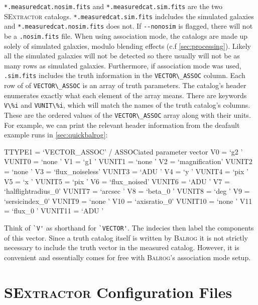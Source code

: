 \documentclass[12pt]{book}
\newcommand{\codett}[1]{\lstinline{#1}}
\newcommand{\balrog}{\textsc{Balrog}}
\newcommand{\sex}{\textsc{SExtractor}}
\newcommand{\opt}[1]{\codett{--#1}}
\begin{document}
\codett{*.measuredcat.nosim.fits} and \codett{*.measuredcat.sim.fits} are the two \sex{} catalogs.
\codett{*.measuredcat.sim.fits} indcludes the simulated galaxies and \codett{*.measuredcat.nosim.fits} does not.
If \opt{nonosim} is flagged, there will not be a \codett{.nosim.fits} file.
When using association mode, the catalogs are made up solely of simulated galaxies, 
modulo blending effects (c.f \autoref{sec:processing}). Likely all the simulated galaxies will not
be detected so there usually will not be as many rows as simulated galaxies.
Furthermore, if association mode was used, \codett{.sim.fits} includes the truth information
in the \codett{VECTOR\_ASSOC} column. Each row of of \codett{VECTOR\_ASSOC} is an array of truth parameters.
The catalog's header enumerates exactly what each element of the array means.
There are keywords \codett{V\%i} and \codett{VUNIT\%i}, which will match the names of the truth catalog's columns.
These are the ordered values of the \codett{VECTOR\_ASSOC} array along with their units.
For example, we can print the relevant header information from the deafault example runs in \autoref{sec:quickbalrog}:
\begin{cmdline}
TTYPE1  = `VECTOR_ASSOC'       / ASSOCiated parameter vector
V0      = `g2      '
VUNIT0  = `none    '
V1      = `g1      '
VUNIT1  = `none    '
V2      = `magnification'
VUNIT2  = `none    '
V3      = `flux_noiseless'
VUNIT3  = `ADU     '
V4      = `y       '
VUNIT4  = `pix     '
V5      = `x       '
VUNIT5  = `pix     '
V6      = `flux_noised'
VUNIT6  = `ADU     '
V7      = `halflightradius_0'
VUNIT7  = `arcsec  '
V8      = `beta_0  '
VUNIT8  = `deg     '
V9      = `sersicindex_0'
VUNIT9  = `none    '
V10     = `axisratio_0'
VUNIT10 = `none    '
V11     = `flux_0  '
VUNIT11 = `ADU     '
\end{cmdline}
Think of \codett{`V'} as shorthand for \codett{`VECTOR'}. The indecies then label the components of this vector.
Since a truth catalog itself is written by \balrog{} it is not strictly necessary to include the truth
vector in the measured catalog. However, it is convenient and essentially comes for free with \balrog{}'s
association mode setup. 

\section{\sex{} Configuration Files}
\label{sec:sexfiles}
\end{document}
